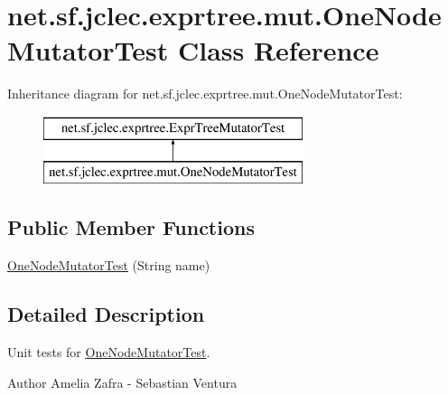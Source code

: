 \hypertarget{classnet_1_1sf_1_1jclec_1_1exprtree_1_1mut_1_1_one_node_mutator_test}{\section{net.\-sf.\-jclec.\-exprtree.\-mut.\-One\-Node\-Mutator\-Test Class Reference}
\label{classnet_1_1sf_1_1jclec_1_1exprtree_1_1mut_1_1_one_node_mutator_test}
}
Inheritance diagram for net.\-sf.\-jclec.\-exprtree.\-mut.\-One\-Node\-Mutator\-Test\-:\begin{figure}[H]
\begin{center}
\leavevmode
\includegraphics[height=2.000000cm]{classnet_1_1sf_1_1jclec_1_1exprtree_1_1mut_1_1_one_node_mutator_test}
\end{center}
\end{figure}
\subsection*{Public Member Functions}
\begin{DoxyCompactItemize}
\item 
\hyperlink{classnet_1_1sf_1_1jclec_1_1exprtree_1_1mut_1_1_one_node_mutator_test_abb5a8b2355118540ea67cad962a89fe6}{One\-Node\-Mutator\-Test} (String name)
\end{DoxyCompactItemize}


\subsection{Detailed Description}
Unit tests for \hyperlink{classnet_1_1sf_1_1jclec_1_1exprtree_1_1mut_1_1_one_node_mutator_test}{One\-Node\-Mutator\-Test}.

\begin{DoxyAuthor}{Author}
Amelia Zafra -\/ Sebastian Ventura 
\end{DoxyAuthor}


